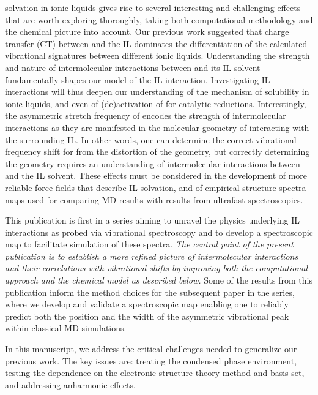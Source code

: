\documentclass[%
  class = book,%
  crop = false,%
  float = true,%
  multi = true,%
  preview = false,%
]{standalone}
\let\cite\autocite
\newcommand{\cotil}{\ce{CO2}\textendash{}IL\xspace}%
\begin{document}
 solvation in ionic liquids gives rise to several interesting and challenging effects that are worth exploring thoroughly, taking both computational methodology and the chemical picture into account. Our previous work suggested that charge transfer (CT) between  and the IL dominates the differentiation of the calculated vibrational signatures between different ionic liquids. Understanding the strength and nature of intermolecular interactions between  and its IL solvent fundamentally shapes our model of the \cotil interaction. Investigating \cotil interactions will thus deepen our understanding of the mechanism of  solubility in ionic liquids, and even of (de)activation of  for catalytic reductions. Interestingly, the asymmetric stretch frequency of  encodes the strength of intermolecular interactions as they are manifested in the molecular geometry of  interacting with the surrounding IL. In other words, one can determine the correct vibrational frequency shift for  from the distortion of the  geometry, but correctly determining the  geometry requires an understanding of intermolecular interactions between  and the IL solvent. These effects must be considered in the development of more reliable force fields that describe \cotil solvation, and of empirical structure-spectra maps used for comparing MD results with results from ultrafast spectroscopies.

This publication is first in a series aiming to unravel the physics underlying \cotil interactions as probed via vibrational spectroscopy and to develop a spectroscopic map to facilitate simulation of these spectra. \emph{The central point of the present publication is to establish a more refined picture of intermolecular interactions and their correlations with vibrational shifts by improving both the computational approach and the chemical model as described below.} Some of the results from this publication inform the method choices for the subsequent paper in the series, where we develop and validate a spectroscopic map enabling one to reliably predict both the position and the width of the  asymmetric vibrational peak within classical MD simulations.\cite{Daly2016}

In this manuscript, we address the critical challenges needed to generalize our previous work. The key issues are: treating the condensed phase environment, testing the dependence on the electronic structure theory method and basis set, and addressing anharmonic effects.
\end{document}
